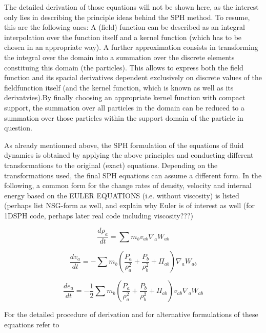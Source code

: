 \documentclass{report}
\begin{document}
The detailed derivation of those equations will not be shown here, as the
interest  only lies in describing the principle ideas behind the SPH
method. To resume, this are the following ones: A (field) function can be
described as an integral interpolation over the function itself and a kernel
function (which has to be chosen in an appropriate way). A further
approximation consists in transforming the integral over the domain into a
summation over the discrete elements constituing this domain (the particles). This allows to express both
the field function and its spacial derivatives dependent exclusively on discrete values
of the fieldfunction itself (and the kernel function, which is known as well as
its derivatvies).By finally choosing an appropriate kernel function with
compact support, the summation over all particles in the domain can be reduced
to a summation over those particles within the support domain of the particle
in question.

As already mentionned above, the SPH formulation of the equations of fluid
dynamics is obtained by applying the above principles and conducting different
transformations to the original (exact) equations. Depending on the
transformations used, the final SPH equations can assume a different form. In
the following, a common form for the change rates of density, velocity and
internal energy based on the EULER EQUATIONS (i.e. without viscosity) is
listed\cite{Monaghan2005}\cite{Liu2003} (perhaps list NSG-form as well, and
explain why Euler is of interest as well (for 1DSPH code, perhaps later real
code including viscosity???)

\begin{equation}
\frac{d\rho _a}{\mathit{dt}}=\sum{m_{b}v_{\mathit{ab}}\nabla _{a}W_{\mathit{ab}}}
\end{equation}

\begin{equation}
\label{eq:VelChangeRate}
\frac{dv_{a}}{\mathit{dt}}=-\sum {m_{b}(\frac{P_{a}}{\rho_{a}^{2}}+\frac{P_{b}}{\rho _{b}^{2}}+\Pi _{ab})\nabla_{a}W_{ab}}
\end{equation}


\begin{equation}
\frac{de_{a}}{\mathit{dt}}=-\mathit{}\frac{1}{2}\sum{m_{b}(\frac{P_{a}}{\rho _{a}^{2}}+\frac{P_{b}}{\rho _{b}^{2}}+\Pi_{\mathit{ab}})v_{\mathit{ab}}\nabla _{a}W_{\mathit{ab}}}
\end{equation}



For the detailed procedure of derivation and for alternative formulations of
these equations refer to \cite{Monaghan2005}\cite{Liu2003}
\end{document}
